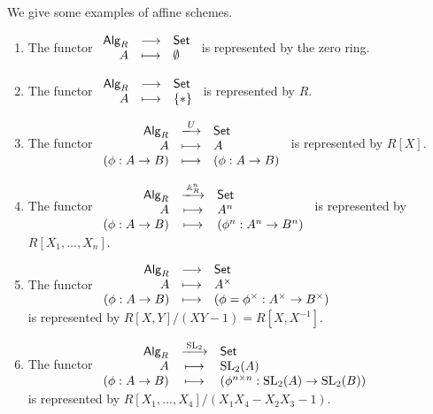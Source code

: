 	We give some examples of affine schemes.
	\begin{example}
		\vspace{-2em}
		\begin{enumerate}[$(i)$]
			\item{
				The functor 
				$\begin{array}{rcl}
					\textsf{Alg}_R & \longrightarrow & \textsf{Set}\\
					A & \longmapsto & \emptyset
				\end{array}$ is represented by the zero ring.
			}
			\item{
				The functor $\begin{array}{rcl}
					\textsf{Alg}_R & \longrightarrow & \textsf{Set}\\
					A & \longmapsto & \{*\}
				\end{array}$ is represented by $R$.
			}
			\item{
				The functor $\begin{array}{rcl}
					\ncat{Alg}_R & \xlongrightarrow{U} & \ncat{Set}\\
					A & \longmapsto & A\\
					(\phi:A\rightarrow B) & \longmapsto & (\phi:A\rightarrow B)
				\end{array}$ is represented by $R[X]$.
			}
			\item{
				The functor $\begin{array}{rcl}
					\ncat{Alg}_R & \xlongrightarrow{\A_R^n} & \ncat{Set}\\
					A & \longmapsto & A^n\\
					(\phi:A\rightarrow B) & \longmapsto & (\phi^n:A^n\rightarrow B^n)
				\end{array}$ is represented by $R[X_1,...,X_n]$.
			}
			\item{
				The functor $\begin{array}{rcl}
					\textsf{Alg}_R & \longrightarrow & \textsf{Set}\\
					A & \longmapsto & A^\times\\
					(\phi:A\rightarrow B) & \longmapsto & (\phi=\phi^\times:A^\times\rightarrow B^\times)
				\end{array}$\vspace{.5em}\\
				is represented by $R[X,Y]/(XY-1)=R[X,X^{-1}]$.
			}
			\item{
				The functor $\begin{array}{rcl}
					\ncat{Alg}_R & \xlongrightarrow{\SL_2} & \ncat{Set}\\
					A & \longmapsto & \SL_2(A)\\
					(\phi:A\rightarrow B) & \longmapsto & (\phi^{n\times n}:\SL_2(A)\rightarrow \SL_2(B))
				\end{array}$\vspace{.5em}\\
				is represented by $R[X_1,...,X_4]/(X_1X_4-X_2X_3-1)$.
			}
		\end{enumerate}
	\end{example}

